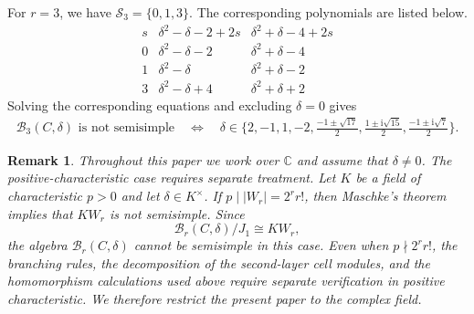 \documentclass[10pt,a4paper]{amsart}
\newtheorem{remark}[theorem]{Remark}
\newcommand{\C}{\mathbb{C}}
\newcommand{\1}{\mathfrak{1}}
\newcommand{\B}{\mathcal{B}}
\begin{document}
For $r=3$, we have $\mathscr S_3=\{0,1,3\}$.
The corresponding polynomials are listed below.
$$
\begin{array}{c|c|c}
s&\delta^2-\delta-2+2s&\delta^2+\delta-4+2s\\ \hline
0&\delta^2-\delta-2&\delta^2+\delta-4\\
1&\delta^2-\delta&\delta^2+\delta-2\\
3&\delta^2-\delta+4&\delta^2+\delta+2
\end{array}
$$
Solving the corresponding equations and excluding
$\delta=0$ gives
$$
\begin{aligned}
\B_3(C,\delta)\text{ is not semisimple}
\quad\Longleftrightarrow\quad
\delta\in\Bigg\{
2,-1,1,-2,
\frac{-1\pm\sqrt{17}}{2},
\frac{1\pm\mathrm i\sqrt{15}}{2},
\frac{-1\pm\mathrm i\sqrt7}{2}
\Bigg\}.
\end{aligned}
$$

\begin{remark}
Throughout this paper we work over $\C$ and assume that $\delta\neq0$. The positive-characteristic case requires separate treatment. Let $K$ be a field of characteristic $p>0$ and let $\delta\in K^\times$. If $p\mid |W_r|=2^r r!$, then Maschke's theorem implies that $K W_r$ is not semisimple. Since 
$$
\B_r(C, \delta)/J_1\cong KW_r,
$$ 
the algebra $\B_r(C,\delta)$ cannot be semisimple in this case. Even
when $p\nmid 2^r r!$, the branching rules, the decomposition of the
second-layer cell modules, and the homomorphism calculations used above require separate verification in positive characteristic. We therefore restrict the present paper to the complex field.  
\end{remark}
\end{document}
